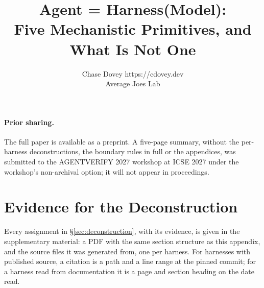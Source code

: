 \documentclass[10pt]{article}
\title{Agent = Harness(Model):\\Five Mechanistic Primitives, and What Is Not One}
\author{\name Chase Dovey \email https://cdovey.dev\\\addr Average Joes Lab}
\begin{document}
\maketitle











\paragraph{Prior sharing.} The full paper is available as a preprint. A five-page summary, without the per-harness deconstructions, the boundary rules in full or the appendices, was submitted to the AGENTVERIFY 2027 workshop at ICSE 2027 under the workshop's non-archival option; it will not appear in proceedings.




\appendix



\section{Evidence for the Deconstruction}
\label{app:evidence}
Every assignment in \S\ref{sec:deconstruction}, with its evidence, is given in the supplementary material: a PDF with the same section structure as this appendix, and the source files it was generated from, one per harness. For harnesses with published source, a citation is a path and a line range at the pinned commit; for a harness read from documentation it is a page and section heading on the date read.
\end{document}
